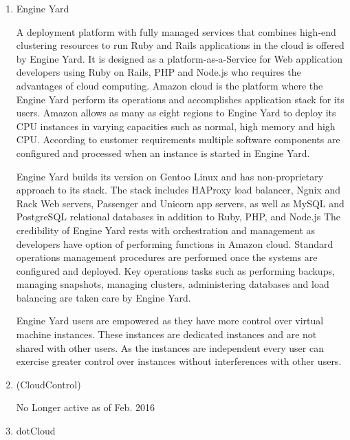 \begin{enumerate}
\item {} 
Engine Yard \label{\detokenize{i524/technologies:id198}}{\hyperref[\detokenize{i524/technologies:www-engineyard}]{\sphinxcrossref{{[}170{]}}}}

A deployment platform with fully managed services that combines
high-end clustering resources to run Ruby and Rails applications
in the cloud is offered by Engine Yard. It is designed as a
platform-as-a-Service for Web application developers using Ruby on
Rails, PHP and Node.js who requires the advantages of cloud
computing. Amazon cloud is the platform where the Engine Yard
perform its operations and accomplishes application stack for its
users. Amazon allows as many as eight regions to Engine Yard to
deploy its CPU instances in varying capacities such as normal,
high memory and high CPU. According to customer requirements
multiple software components are configured and processed when an
instance is started in Engine Yard.

Engine Yard builds its version on Gentoo Linux and has
non-proprietary approach to its stack. The stack includes HAProxy
load balancer, Ngnix and Rack Web servers, Passenger and Unicorn
app servers, as well as MySQL and PostgreSQL relational databases
in addition to Ruby, PHP, and Node.js The credibility of Engine
Yard rests with orchestration and management as developers have
option of performing functions in Amazon cloud. Standard
operations management procedures are performed once the systems
are configured and deployed. Key operations tasks such as
performing backups, managing snapshots, managing clusters,
administering databases and load balancing are taken care by
Engine Yard.

Engine Yard users are empowered as they have more control over
virtual machine instances. These instances are dedicated instances
and are not shared with other users. As the instances are
independent every user can exercise greater control over instances
without interferences with other users.

\item {} 
(CloudControl)

No Longer active as of Feb. 2016 \label{\detokenize{i524/technologies:id199}}{\hyperref[\detokenize{i524/technologies:www-wiki}]{\sphinxcrossref{{[}171{]}}}}

\item {} 
dotCloud \label{\detokenize{i524/technologies:id200}}{\hyperref[\detokenize{i524/technologies:www-dotcloud}]{\sphinxcrossref{{[}172{]}}}}


\end{enumerate}
